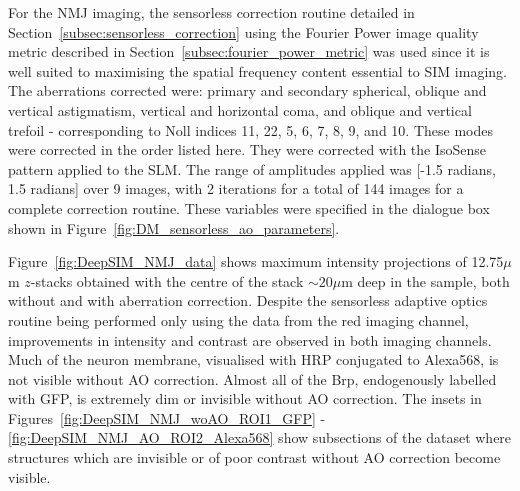For the NMJ imaging, the sensorless correction routine detailed in 
Section~\ref{subsec:sensorless_correction} using the Fourier Power image 
quality metric described in Section~\ref{subsec:fourier_power_metric}
was used since 
it is well suited to maximising the spatial frequency content essential to
SIM imaging. The aberrations corrected were: primary and secondary 
spherical, oblique and vertical astigmatism, vertical and horizontal coma, 
and oblique and vertical trefoil - corresponding to Noll indices 11, 22, 5, 
6, 7, 8, 9, and 10. These modes were corrected in the order listed
here. They were corrected with the IsoSense pattern applied to the SLM. The 
range of amplitudes applied was [-1.5 radians, 1.5 radians] over 9 images, 
with 2 iterations for a total of 144 images for a complete correction 
routine. These variables were specified in the dialogue box shown in 
Figure~\ref{fig:DM_sensorless_ao_parameters}.

Figure~\ref{fig:DeepSIM_NMJ_data} shows maximum intensity projections of 12.75$\mu$m $z$-stacks obtained with the centre of the stack $\sim20\mu$m deep in the sample, both without and with aberration correction. Despite the sensorless adaptive optics routine being performed only using the data 
from the red imaging channel, improvements in intensity and contrast
are observed in both imaging channels. Much of the neuron membrane, 
visualised with HRP conjugated to Alexa568, is not visible without AO 
correction. Almost all of the Brp, endogenously labelled with GFP, is 
extremely dim or invisible without AO correction. The insets in 
Figures~\ref{fig:DeepSIM_NMJ_woAO_ROI1_GFP} -
\ref{fig:DeepSIM_NMJ_AO_ROI2_Alexa568} show subsections of the dataset 
where structures which are invisible or of poor contrast without AO 
correction become visible.

